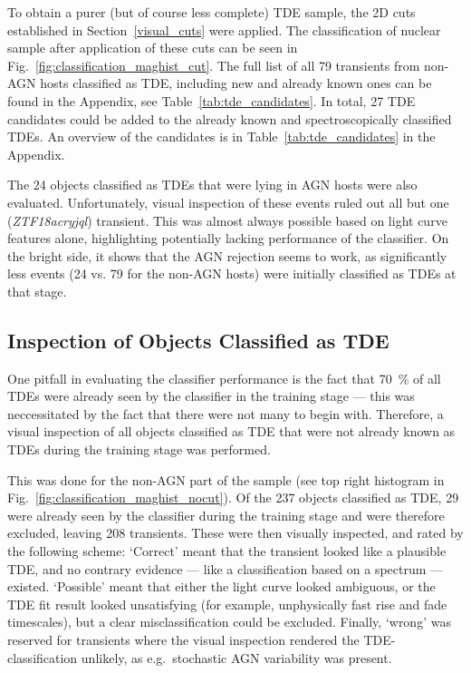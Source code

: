 To obtain a purer (but of course less complete) TDE sample, the 2D cuts established in Section~\ref{visual_cuts} were applied. The classification of nuclear sample after application of these cuts can be seen in Fig.~\ref{fig:classification_maghist_cut}. The full list of all 79 transients from non-AGN hosts classified as TDE, including new and already known ones can be found in the Appendix, see Table~\ref{tab:tde_candidates}. In total, 27 TDE candidates could be added to the already known and spectroscopically classified TDEs. An overview of the candidates is in Table~\ref{tab:tde_candidates} in the Appendix.

The 24 objects classified as TDEs that were lying in AGN hosts were also evaluated. Unfortunately, visual inspection of these events ruled out all but one (\textit{ZTF18acryjql}) transient. This was almost always possible based on light curve features alone, highlighting potentially lacking performance of the classifier. On the bright side, it shows that the AGN rejection seems to work, as significantly less events (24 vs. 79 for the non-AGN hosts) were initially classified as TDEs at that stage.

\subsection{Inspection of Objects Classified as TDE}\label{all_tde_inspection}
One pitfall in evaluating the classifier performance is the fact that \SI{70}{\percent} of all TDEs were already seen by the classifier in the training stage --- this was neccessitated by the fact that there were not many to begin with. Therefore, a visual inspection of all objects classified as TDE that were not already known as TDEs during the training stage was performed.

This was done for the non-AGN part of the sample (see top right histogram in Fig.~\ref{fig:classification_maghist_nocut}). Of the 237 objects classified as TDE, 29 were already seen by the classifier during the training stage and were therefore excluded, leaving 208 transients. These were then visually inspected, and rated by the following scheme: `Correct' meant that the transient looked like a plausible TDE, and no contrary evidence --- like a classification based on a spectrum --- existed. `Possible' meant that either the light curve looked ambiguous, or the TDE fit result looked unsatisfying (for example, unphysically fast rise and fade timescales), but a clear misclassification could be excluded. Finally, `wrong' was reserved for transients where the visual inspection rendered the TDE-classification unlikely, as e.g.~stochastic AGN variability was present.

